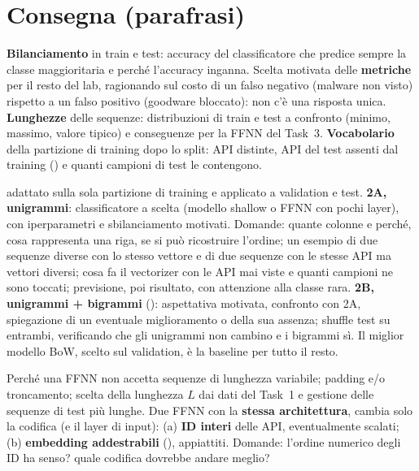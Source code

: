 \section{Consegna (parafrasi)}
\begin{description}[style=nextline,leftmargin=1.2em]
\item[Task 1 -- Guardare i dati prima di modellarli]
  \textbf{Bilanciamento} in train e test: accuracy del classificatore che predice sempre la classe
  maggioritaria e perché l'accuracy inganna. Scelta motivata delle \textbf{metriche} per il resto del
  lab, ragionando sul costo di un falso negativo (malware non visto) rispetto a un falso positivo
  (goodware bloccato): non c'è una risposta unica.
  \textbf{Lunghezze} delle sequenze: distribuzioni di train e test a confronto (minimo, massimo,
  valore tipico) e conseguenze per la FFNN del Task~3.
  \textbf{Vocabolario} della partizione di training dopo lo split: API distinte, API del test assenti
  dal training () e quanti campioni di test le contengono.
\item[Task 2 -- Bag-of-Words, la baseline da battere]
   adattato sulla sola partizione di training e applicato a validation e test.
  \textbf{2A, unigrammi}: classificatore a scelta (modello shallow o FFNN con pochi layer), con
  iperparametri e sbilanciamento motivati. Domande: quante colonne e perché, cosa rappresenta una
  riga, se si può ricostruire l'ordine; un esempio di due sequenze diverse con lo stesso vettore e
  di due sequenze con le stesse API ma vettori diversi; cosa fa il vectorizer con le API mai viste
  e quanti campioni ne sono toccati; previsione, poi risultato, con attenzione alla classe rara.
  \textbf{2B, unigrammi + bigrammi} (): aspettativa motivata, confronto
  con 2A, spiegazione di un eventuale miglioramento o della sua assenza; shuffle test su entrambi,
  verificando che gli unigrammi non cambino e i bigrammi sì. Il miglior modello BoW, scelto sul
  validation, è la baseline per tutto il resto.
\item[Task 3 -- FFNN su finestre di lunghezza fissa]
  Perché una FFNN non accetta sequenze di lunghezza variabile; padding e/o troncamento; scelta della
  lunghezza $L$ dai dati del Task~1 e gestione delle sequenze di test più lunghe. Due FFNN con la
  \textbf{stessa architettura}, cambia solo la codifica (e il layer di input): (a) \textbf{ID interi}
  delle API, eventualmente scalati; (b) \textbf{embedding addestrabili} (),
  appiattiti. Domande: l'ordine numerico degli ID ha senso? quale codifica dovrebbe andare meglio?

\end{description}
